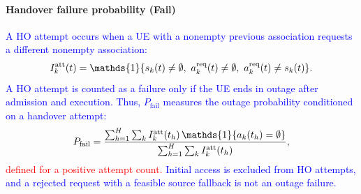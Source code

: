 \documentclass[10pt,letterpaper,journal]{IEEEtran}
\newcommand{\mathbbm}[1]{\mathds{#1}}
\newcommand{\revnew}[1]{\textcolor{red}{#1}}
\begin{document}
\paragraph{Handover failure probability (Fail)}
\textcolor{blue}{A HO attempt occurs when a UE with a nonempty previous association requests a different nonempty association:
\begin{equation}
I_k^{\rm att}(t)
=\mathbbm{1}\{s_k(t)\ne\emptyset,\ a_k^{\rm req}(t)\ne\emptyset,\ a_k^{\rm req}(t)\ne s_k(t)\}. 
\end{equation}
A HO attempt is counted as a failure only if the UE ends in outage after admission and execution.
Thus, $P_{\mathrm{fail}}$ measures the outage probability conditioned on a handover attempt:
\begin{equation}
P_{\mathrm{fail}}
=
\frac{\sum_{h=1}^{H}\sum_k I_k^{\rm att}(t_h)\,\mathbbm{1}\{a_k(t_h)=\emptyset\}}
{\sum_{h=1}^{H}\sum_k I_k^{\rm att}(t_h)},
\label{eq:metric_fail}
\end{equation}}
\revnew{defined for a positive attempt count.}
\textcolor{blue}{Initial access is excluded from HO attempts, and a rejected request with a feasible source fallback is not an outage failure.}
\end{document}
